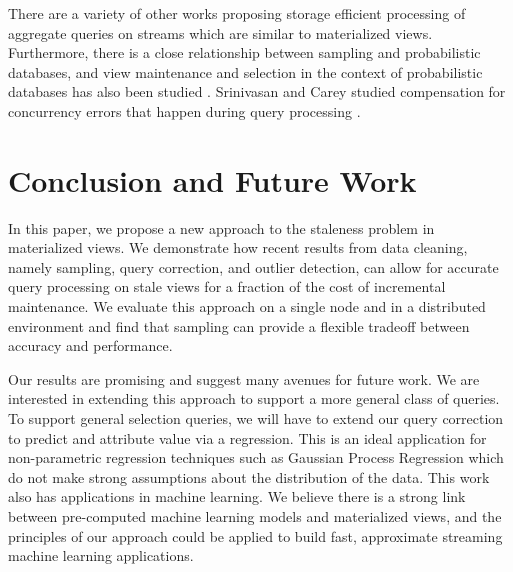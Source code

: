 There are a variety of other works proposing storage efficient processing of aggregate queries on streams \cite{dobra2002processing, greenwald2001space} which are similar to materialized views. Furthermore, there is a close relationship between sampling and probabilistic databases, and view maintenance and selection in the context of probabilistic databases has also been studied \cite{re2007materialized}.
Srinivasan and Carey studied compensation for concurrency errors that happen during query processing \cite{srinivasanC92}.
\section{Conclusion and Future Work}\label{conclusion}
In this paper, we propose a new approach to the staleness problem in materialized views.
We demonstrate how recent results from data cleaning, namely sampling, query correction, and outlier detection, can
allow for accurate query processing on stale views for a fraction of the cost of incremental maintenance. 
We evaluate this approach on a single node and in a distributed environment and find that sampling can provide a flexible tradeoff 
between accuracy and performance.

Our results are promising and suggest many avenues for future work.
We are interested in extending this approach to support a more general class of queries.
To support general selection queries, we will have to extend our query correction to predict and attribute value via a regression.
This is an ideal application for non-parametric regression techniques such as Gaussian Process Regression which do
not make strong assumptions about the distribution of the data.
This work also has applications in machine learning.
We believe there is a strong link between pre-computed machine learning models and materialized views, and the principles of our approach could be applied
to build fast, approximate streaming machine learning applications.



